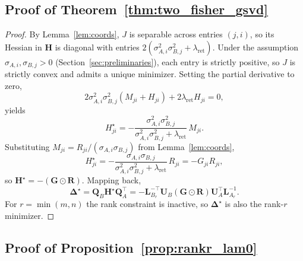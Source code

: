 \documentclass[11pt]{article}
\begin{document}
\subsection{Proof of Theorem~\ref{thm:two_fisher_gsvd}}
\label{app:thm_proof}

\begin{proof}
By Lemma~\ref{lem:coords}, $J$ is separable across entries $(j,i)$, so its Hessian in $\mathbf{H}$ is diagonal with entries $2(\sigma_{A,i}^2\sigma_{B,j}^2 + \lambda_{\mathrm{ret}})$. Under the assumption $\sigma_{A,i},\sigma_{B,j}>0$ (Section~\ref{sec:preliminaries}), each entry is strictly positive, so $J$ is strictly convex and admits a unique minimizer. Setting the partial derivative to zero,
\[
2\sigma_{A,i}^2\sigma_{B,j}^2(M_{ji}+H_{ji}) + 2\lambda_{\mathrm{ret}}H_{ji} = 0,
\]
yields
\[
H_{ji}^\star = -\frac{\sigma_{A,i}^2\sigma_{B,j}^2}{\sigma_{A,i}^2\sigma_{B,j}^2 + \lambda_{\mathrm{ret}}}\,M_{ji}.
\]
Substituting $M_{ji} = R_{ji}/(\sigma_{A,i}\sigma_{B,j})$ from Lemma~\ref{lem:coords},
\[
H_{ji}^\star = -\frac{\sigma_{A,i}\sigma_{B,j}}{\sigma_{A,i}^2\sigma_{B,j}^2 + \lambda_{\mathrm{ret}}}\,R_{ji} = -G_{ji}R_{ji},
\]
so $\mathbf{H}^\star = -(\mathbf{G}\odot\mathbf{R})$. Mapping back,
\[
\mathbf{\Delta}^\star = \mathbf{Q}_B\mathbf{H}^\star\mathbf{Q}_A^\top = -\mathbf{L}_{B_r}^{-\top}\mathbf{U}_B(\mathbf{G}\odot\mathbf{R})\mathbf{U}_A^\top\mathbf{L}_{A_r}^{-1}.
\]
For $r=\min(m,n)$ the rank constraint is inactive, so $\mathbf{\Delta}^\star$ is also the rank-$r$ minimizer.
\end{proof}

\subsection{Proof of Proposition~\ref{prop:rankr_lam0}}
\label{app:prop1_proof}
\end{document}
